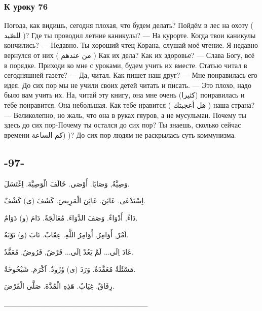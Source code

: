 \documentclass[a5paper]{article}
\begin{document}
\subsubsection{К уроку 76}
Погода, как видишь, сегодня плохая, что будем делать? Пойдём в лес на охоту ( للصّيد )? Где ты проводил летние каникулы? — На курорте. Когда твои каникулы кончились? — Недавно. Ты хороший чтец Корана, слушай моё чтение. Я недавно вернулся от них ( من عندهم ) Как их дела? Как их здоровье? — Слава Богу, всё в порядке. Приходи ко мне с уроками, будем учить их вместе. Статью читал в сегодняшней газете? — Да, читал. Как пишет наш друг? — Мне понравилась его идея. До сих пор мы не учили своих детей читать и писать. — Это плохо, надо было вам учить их. На, читай эту книгу, она мне очень (كثيرا) понравилась и тебе понравится. Она небольшая. Как тебе нравится ( هل أعجبتك ) наша страна? — Великолепно, но жаль, что она в руках гяуров, а не мусульман. Почему ты здесь до сих пор-Почему ты остался до сих пор? Ты знаешь, сколько сейчас времени كم الساعة) )? До сих пор людям не раскрылась суть коммунизма.

\subsection{-97-}
وَصِيَّةٌ, وَصَايَا. أَوْصَى. خَالَفَ الْوَصِيَّةَ. اِغْتَسَلَ.

اِسْتَدْعَى. عَايَنَ. عَايَنَ الْمَرِيضَ. كَشَفَ (ى) كَشْفٌ.

دَاءٌ, أَدْوَاءٌ. وَصَفَ الدَّوَاءَ. مُعَالَجَةٌ. دَامَ (و) دَوَامٌ.

اَمْرٌ, أَوَامِرُ. أَوَامِرُ اللَّهِ. عِقَابٌ. تَابَ (و) تَوْبَةٌ.

عَادَ اِلَى... لَمْ يَعُدْ اِلَى... فَرْضٌ, فَرُوضٌ. مُعَقَّدٌ.

مَسْئَلَةٌ مُعَقَّدَةٌ. وَرَدَ (ى) وُرُودٌ. اَكْرَمَ. شَيْخُوخَةٌ.

رِفَاقٌ. غِيَابٌ. هَذِهِ الْمُدَّةَ. صَلَّى الْفَرْضَ.

\_\_\_\_\_\_\_\_\_\_\_\_\_\_\_\_\_\_\_\_\_\_\_\_\_\_\_
\end{document}
